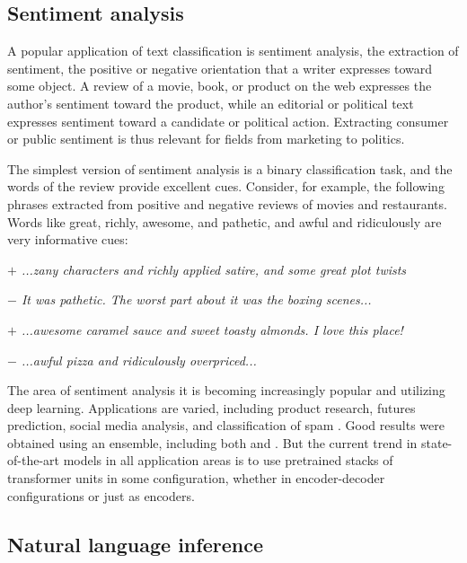 \subsection{Sentiment analysis}\label{subsec:sentiment-analysis}
A popular application of text classification is sentiment analysis, the extraction of sentiment, the positive or negative orientation that a writer expresses toward some object. A review of a movie, book, or product on the web expresses the author's sentiment toward the product, while an editorial or political text expresses sentiment toward a candidate or political action. Extracting consumer or public sentiment is thus relevant for fields from marketing to politics. \cite{Jurafsky2009}

The simplest version of sentiment analysis is a binary classification task, and
the words of the review provide excellent cues. Consider, for example, the following phrases extracted from positive and negative reviews of movies and restaurants. Words like great, richly, awesome, and pathetic, and awful and ridiculously are very informative cues:

\emph{$+$ ...zany characters and richly applied satire, and some great plot twists}
\par
\emph{$-$ It was pathetic. The worst part about it was the boxing scenes...}
\par
\emph{$+$ ...awesome caramel sauce and sweet toasty almonds. I love this place!}
\par
\emph{$-$ ...awful pizza and ridiculously overpriced...} 

The area of sentiment analysis it is becoming increasingly popular and utilizing deep learning. Applications are varied, including product research, futures prediction, social media analysis, and classification of spam \cite{ZhengWG18}. 
Good results were obtained using an ensemble, including both  and  \cite{Cliche17}.
But the current trend in state-of-the-art models in all application areas is to use pretrained stacks of transformer units in some configuration, whether in encoder-decoder configurations or just as encoders.


\subsection{Natural language inference}\label{subsec:nli}

